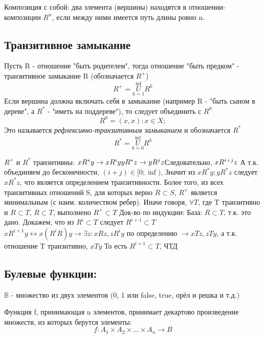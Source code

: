 \documentclass{article}
\begin{document}
Композиция с собой: два элемента (вершины) находятся в отношении-композиции $ R^{n} $, если между ними имеется путь длины ровно n.

\subsection{Транзитивное замыкание} 
Пусть R - отношение "быть родителем", тогда отношение "быть предком" - транзитивное замыкание R (обозначается $ R^{+} $)
\[R^{+} = \overset{\inf}{\underset{k=1}{U}}R^{k}\]
Если вершина должна включать себя в замыкание (например R - "быть сыном в дереве", а $R^{*}$ - "иметь на поддереве"), то следует объединить с $R^{0}$
\[R^{0} = (x, x): x \in X; \]
Это называется \textit{рефлексивно-транзитивным замыканием} и обозначается $R^{*}$
\[R^{*} = \overset{\inf}{\underset{k=0}{U}}R^{k}\]

$R^{+}$ и $R^{*}$ транзитивны:
$ \newline
xR^{*}y \rightarrow xR^{i}y \newline 
yR^{*}z \rightarrow yR^{j}z \newline
$Следовательно, $ xR^{i+j}z \newline 
$ А т.к. объединяем до бесконечности, $(i+j) \in [0; \inf) $, Значит из $ xR^{*}y; yR^{*}z $ следует $ xR^{*}z $, что является определением транзитивности.
Более того, из всех транзитивных отношений S, для которых верно $ R \subset S $, $R^{+}$ является минимальным (с наим. количеством ребер).
Иначе говоря, $\forall T$, где T транзитивно и $R \subset T$, $R \subset T$, выполнено $R^{+} \subset T$ \newline
Док-во по индукции:\newline
База: $R \subset T$, т.к. это дано.\newline
Докажем, что из $ R^{i} \subset T $ следует $ R^{i+1} \subset T $ \newline
$ xR^{i+1}y \leftrightarrow x(R^{i}R)y \rightarrow \exists z: xRz, zR^iy $ по определению \newline
$ \rightarrow xTz, zTy$, а т.к. отношение T транзитивно, $xTy$ \newline То есть $ R^{i+1} \subset T $, ЧТД

\subsection{Булевые функции:}
$ \mathbb{B} $ - множество из двух элементов ({0, 1} или {false, true}, {орёл и решка} и т.д.)

Функция f, принимающая n элементов, принимает декартово произведение множеств, из которых берутся элементы:
\[ f: A_1 \times A_2 \times ... \times A_n \longrightarrow B\]
\end{document}
